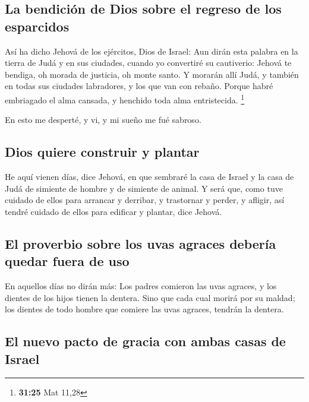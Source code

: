 \hypertarget{la-bendiciuxf3n-de-dios-sobre-el-regreso-de-los-esparcidos}{%
\subsection{La bendición de Dios sobre el regreso de los
esparcidos}\label{la-bendiciuxf3n-de-dios-sobre-el-regreso-de-los-esparcidos}}

 Así ha dicho Jehová de los ejércitos, Dios de Israel:
Aun dirán esta palabra en la tierra de Judá y en sus ciudades, cuando yo
convertiré su cautiverio: Jehová te bendiga, oh morada de justicia, oh
monte santo.  Y morarán allí Judá, y también en todas sus
ciudades labradores, y los que van con rebaño.  Porque
habré embriagado el alma cansada, y henchido toda alma entristecida.
\footnote{\textbf{31:25} Mat 11,28}

 En esto me desperté, y vi, y mi sueño me fué sabroso.

\hypertarget{dios-quiere-construir-y-plantar}{%
\subsection{Dios quiere construir y
plantar}\label{dios-quiere-construir-y-plantar}}

 He aquí vienen días, dice Jehová, en que sembraré la
casa de Israel y la casa de Judá de simiente de hombre y de simiente de
animal.  Y será que, como tuve cuidado de ellos para
arrancar y derribar, y trastornar y perder, y afligir, así tendré
cuidado de ellos para edificar y plantar, dice Jehová.

\hypertarget{el-proverbio-sobre-los-uvas-agraces-deberuxeda-quedar-fuera-de-uso}{%
\subsection{El proverbio sobre los uvas agraces debería quedar fuera de
uso}\label{el-proverbio-sobre-los-uvas-agraces-deberuxeda-quedar-fuera-de-uso}}

 En aquellos días no dirán más: Los padres comieron las
uvas agraces, y los dientes de los hijos tienen la dentera.
 Sino que cada cual morirá por su maldad; los dientes de
todo hombre que comiere las uvas agraces, tendrán la dentera.

\hypertarget{el-nuevo-pacto-de-gracia-con-ambas-casas-de-israel}{%
\subsection{El nuevo pacto de gracia con ambas casas de
Israel}\label{el-nuevo-pacto-de-gracia-con-ambas-casas-de-israel}}

